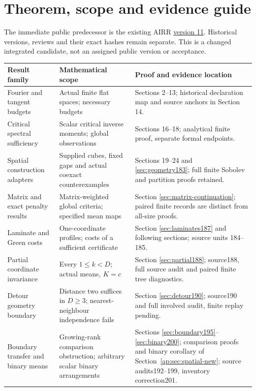 \documentclass[11pt]{article}
\begin{document}
\section*{Theorem, scope and evidence guide}
The immediate public predecessor is the existing AIRR
\href{https://airr.science/papers/ARR-2026-7EPM3V3DP796BBRR/versions/v11/}{version 11}.
Historical versions, reviews and their exact hashes remain separate. This is a
changed integrated candidate, not an assigned public version or acceptance.
\begin{center}\small
\begin{tabular}{@{}p{}p{}p{}@{}}
\toprule
Result family & Mathematical scope & Proof and evidence location\\\midrule
Fourier and tangent budgets & Actual finite flat spaces; necessary budgets & Sections 2--13; historical declaration map and source anchors in Section 14.\\[5pt]
Critical spectral sufficiency & Scalar critical inverse moments; global observations & Sections 16--18; analytical finite proof, separate formal endpoints.\\[5pt]
Spatial construction adapters & Supplied cubes, fixed gaps and actual coexact counterexamples & Sections 19--24 and \ref{sec:geometry183}; full finite Sobolev and partition proofs retained.\\[5pt]
Matrix and exact penalty results & Matrix-weighted global criteria; specified mean maps & Section \ref{sec:matrix-continuation}; paired finite records are distinct from all-size proofs.\\[5pt]
Laminate and Green costs & One-coordinate profiles; costs of a sufficient certificate & Section \ref{sec:laminates187} and following sections; source units 184--185.\\[5pt]
Partial coordinate invariance & Every $1\le k<D$; actual means, $K=c$ & Section \ref{sec:partial188}; source188, full source audit and paired finite tree diagnostics.\\[5pt]
Detour geometry boundary & Distance two suffices in $D\ge3$; nearest-neighbour independence fails & Section \ref{sec:detour190}; source190 and full involved audit, finite replay pending.\\[5pt]
Boundary transfer and binary means & Growing-rank comparison obstruction; arbitrary scalar binary arrangements & Sections \ref{sec:boundary195}--\ref{sec:binary200}; comparison proofs and binary corollary of Section~\ref{ap:sec:spatial-new}; source audits192--199, inventory correction201.\\[5pt]

\end{tabular}
\end{center}
\end{document}
